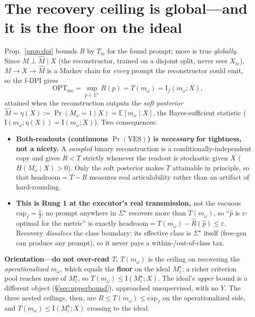 \documentclass[11pt]{article}
\newcommand{\Iv}{\mathrm{I}}
\newcommand{\Mhat}{\widehat{M}}
\newcommand{\te}{\mathrm{te}}
\newcommand{\Mw}{m_\omega}
\newcommand{\Mstar}{M_i^\star}
\begin{document}
\section{The recovery ceiling is global---and it is the floor on the ideal}\label{sec:recceiling}
Prop.~\ref{prop:dpi} bounds $R$ by $T_\te$ for the found prompt; more is true \emph{globally}. Since
$M\perp\Mhat\mid X$ (the reconstructor, trained on a disjoint split, never sees $X_\te$), $M\to X\to\Mhat$ is
a Markov chain for \emph{every} prompt the reconstructor could emit, so the f-DPI gives
\[
\mathrm{OPT}_{\mathrm{rec}}=\sup_{p\in\Sigma^\star}R(p)=T(\Mw)=\Iv_f(\Mw;X),
\]
attained when the reconstruction outputs the \emph{soft posterior}
$\Mhat=\eta(X):=\Pr(M_\omega{=}1\mid X)=\mathbb E[\Mw\mid X]$, the Bayes-sufficient statistic
($\Iv(\Mw;\eta(X))=\Iv(\Mw;X)$). Two consequences:
\begin{itemize}[leftmargin=1.4em,itemsep=1pt]
\item \textbf{Both-readouts (continuous $\Pr(\mathrm{YES})$) is \emph{necessary} for tightness, not a
nicety.} A \emph{sampled} binary reconstruction is a conditionally-independent copy and gives $R<T$ strictly
whenever the readout is stochastic given $X$ ($H(M_\omega\mid X)>0$). Only the soft posterior makes $T$
attainable in principle, so that $\mathrm{headroom}=T-R$ measures real articulability rather than an artifact
of hard-rounding.
\item \textbf{This is Rung 1 at the executor's real transmission,} not the vacuous
$\mathrm{cap}_f=\tfrac12$: no prompt anywhere in $\Sigma^\star$ recovers more than $T(\Mw)$, so ``$\hat p$ is
$\varepsilon$-optimal for the metric'' is exactly $\mathrm{headroom}=T(\Mw)-\widehat R(\hat p)\le\varepsilon$.
Recovery \emph{dissolves} the class boundary: its effective class is $\Sigma^\star$ itself (free-gen can
produce any prompt), so it never pays a within-/out-of-class tax.
\end{itemize}
\textbf{Orientation---do not over-read $T$.} $T(\Mw)$ is the ceiling on recovering the \emph{operationalized}
$\Mw$, which equals the \textbf{floor} on the ideal $\Mstar$: a richer criterion pool reaches more of
$\Mstar$, so $T(\Mw)\le\Iv(\Mstar;X)$. The ideal's \emph{upper} bound is a different object
(\S\ref{sec:upperbound}), approached unsupervised, with no $Y$. The three nested ceilings, then, are
$R\le T(\Mw)\le\mathrm{cap}_f$ on the operationalized side, and $T(\Mw)\le\Iv(\Mstar;X)$ crossing to the
ideal.
\end{document}
